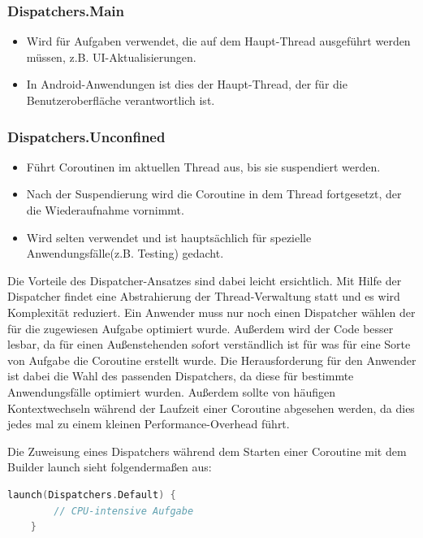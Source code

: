 \documentclass[fontsize=12pt,paper=a4,twoside=semi,parskip=half-,headsepline,headinclude]{scrreprt}
\begin{document}
\subsubsection{Dispatchers.Main}

\begin{itemize}
	\item Wird für Aufgaben verwendet, die auf dem Haupt-Thread ausgeführt werden müssen, z.B. UI-Aktualisierungen.
	\item In Android-Anwendungen ist dies der Haupt-Thread, der für die Benutzeroberfläche verantwortlich ist.
\end{itemize}

\subsubsection{Dispatchers.Unconfined}

\begin{itemize}
	\item Führt Coroutinen im aktuellen Thread aus, bis sie suspendiert werden.
	\item Nach der Suspendierung wird die Coroutine in dem Thread fortgesetzt, der die Wiederaufnahme vornimmt.
	\item Wird selten verwendet und ist hauptsächlich für spezielle Anwendungsfälle(z.B. Testing) gedacht.
\end{itemize}

Die Vorteile des Dispatcher-Ansatzes sind dabei leicht ersichtlich. Mit Hilfe der Dispatcher findet eine Abstrahierung der Thread-Verwaltung statt und es wird Komplexität reduziert. Ein Anwender muss nur noch einen Dispatcher wählen der für die zugewiesen Aufgabe optimiert wurde. Außerdem wird der Code besser lesbar, da für einen Außenstehenden sofort verständlich ist für was für eine Sorte von Aufgabe die Coroutine erstellt wurde. Die Herausforderung für den Anwender ist dabei die Wahl des passenden Dispatchers, da diese für bestimmte Anwendungsfälle optimiert wurden. Außerdem sollte von häufigen Kontextwechseln während der Laufzeit einer Coroutine abgesehen werden, da dies jedes mal zu einem kleinen  Performance-Overhead führt.

Die Zuweisung eines Dispatchers während dem Starten einer Coroutine mit dem Builder launch sieht folgendermaßen aus:

\begin{lstlisting}[language=Kotlin]
	launch(Dispatchers.Default) {
		// CPU-intensive Aufgabe
	}
\end{lstlisting}
\end{document}
